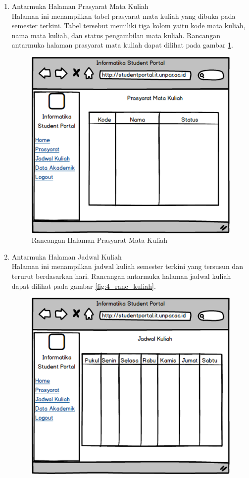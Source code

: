 \begin{enumerate}
	\item {Antarmuka Halaman Prasyarat Mata Kuliah}\\
	Halaman ini menampilkan tabel prasyarat mata kuliah yang dibuka pada semester terkini. Tabel tersebut memiliki tiga kolom yaitu kode mata kuliah, nama mata kuliah, dan status pengambilan mata kuliah. Rancangan antarmuka halaman prasyarat mata kuliah dapat dilihat pada gambar \ref{fig:4_ranc_prasyarat}.
	\begin{figure}[H]
			\centering
			\includegraphics[scale=0.5]{Gambar/Prasyarat_Page}
			\caption{Rancangan Halaman Prasyarat Mata Kuliah} 
			\label{fig:4_ranc_prasyarat}
		\end{figure}
	\item {Antarmuka Halaman Jadwal Kuliah}\\
	Halaman ini menampilkan jadwal kuliah semester terkini yang tersusun dan terurut berdasarkan hari. Rancangan antarmuka halaman jadwal kuliah dapat dilihat pada gambar \ref{fig:4_ranc_kuliah}.
	\begin{figure}[H]
			\centering
			\includegraphics[scale=0.5]{Gambar/Jadwal_Page}

\end{figure}
\end{enumerate}
